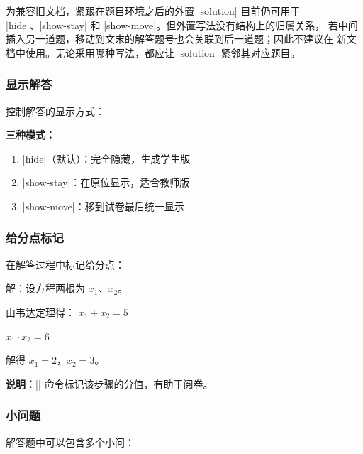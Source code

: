 为兼容旧文档，紧跟在题目环境之后的外置 |solution| 目前仍可用于
|hide|、|show-stay| 和 |show-move|。但外置写法没有结构上的归属关系，
若中间插入另一道题，移动到文末的解答题号也会关联到后一道题；因此不建议在
新文档中使用。无论采用哪种写法，都应让 |solution| 紧邻其对应题目。

\subsubsection{显示解答}

控制解答的显示方式：

\begin{latexcode}
\end{latexcode}

\textbf{三种模式：}
\begin{enumerate}
  \item |hide|（默认）：完全隐藏，生成学生版
  \item |show-stay|：在原位显示，适合教师版
  \item |show-move|：移到试卷最后统一显示
\end{enumerate}

\subsubsection{给分点标记}

在解答过程中标记给分点：

\begin{latexcode}
  \begin{solution}
    解：设方程两根为 $x_1$、$x_2$。

    由韦达定理得：
    $x_1 + x_2 = 5$ 

    $x_1 \cdot x_2 = 6$ 

    解得 $x_1 = 2$，$x_2 = 3$。
  \end{solution}
\end{latexcode}

\textbf{说明：}|| 命令标记该步骤的分值，有助于阅卷。

\subsubsection{小问题}

解答题中可以包含多个小问：

